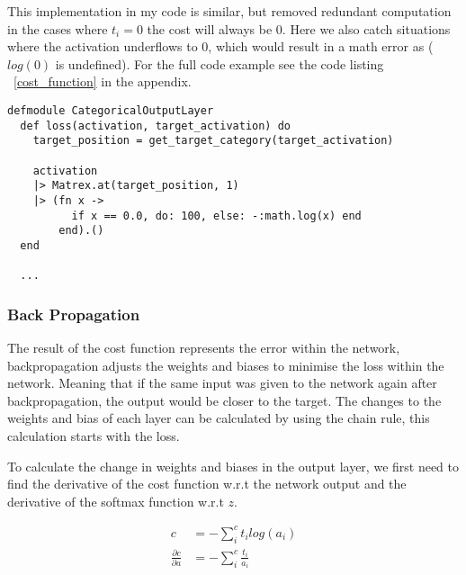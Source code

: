 This implementation in my code is similar, but removed redundant computation in
the cases where \(t_{i} = 0\) the cost will always be 0. Here we also catch
situations where the activation underflows to 0, which would result in a math
error as (\(log(0)\) is undefined). For the full code example see the code listing
~\ref{cost_function} in the appendix.
\begin{lstlisting}
defmodule CategoricalOutputLayer
  def loss(activation, target_activation) do
    target_position = get_target_category(target_activation)

    activation
    |> Matrex.at(target_position, 1)
    |> (fn x ->
          if x == 0.0, do: 100, else: -:math.log(x) end
        end).()
  end

  ...
\end{lstlisting}


\subsubsection{Back Propagation}
The result of the cost function represents the error within the network,
backpropagation adjusts the weights and biases to minimise the loss
 within the network. Meaning that if the same input was
given to the network again after backpropagation, the output would be closer to
the target. The changes to the weights and bias of each layer can be calculated
by using the chain rule, this calculation starts with the loss.

To calculate the change in weights and biases in the output layer, we first need
to find the derivative of the cost function w.r.t the network output and the
derivative of the softmax function w.r.t \(z\).

\begin{equation}
    \begin{aligned}
        c &= - \sum_{i}^{c} t_{i}log(a_{i}) \\
        \frac{\partial c}{\partial a} &= - \sum_{i}^{c} \frac{t_{i}}{a_{i}}
    \end{aligned}
\end{equation}

